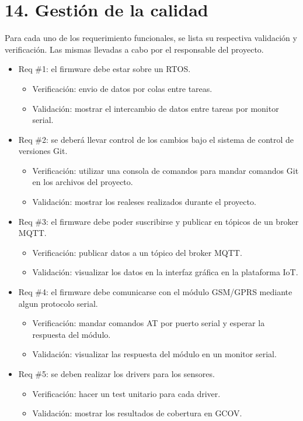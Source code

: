 \documentclass[
11pt, %
codirector, %
]{charter}
\begin{document}
\section{14. Gestión de la calidad}
\label{sec:calidad}
Para cada uno de los requerimiento funcionales, se lista su respectiva validación y verificación. Las mismas llevadas a cabo por el responsable del proyecto.

\begin{itemize} 
	\item Req \#1: el firmware debe estar sobre un RTOS.
	\begin{itemize}
		\item Verificación: envio de datos por colas entre tareas.
		\item Validación: mostrar el intercambio de datos entre tareas por monitor serial. 
	\end{itemize}

	\item Req \#2: se deberá llevar control de los cambios bajo el sistema de control de versiones Git.
	\begin{itemize}
		\item Verificación: utilizar una consola de comandos para mandar comandos Git en los archivos del proyecto.
		\item Validación: mostrar los realeses realizados durante el proyecto.  
	\end{itemize}

	\item Req \#3: el firmware debe poder suscribirse y publicar en tópicos de un broker MQTT.
	\begin{itemize}
		\item Verificación: publicar datos a un tópico del broker MQTT.
		\item Validación: visualizar los datos en la interfaz gráfica en la plataforma IoT. 
	\end{itemize}

	\item Req \#4: el firmware debe comunicarse con el módulo GSM/GPRS mediante algun protocolo serial.
	\begin{itemize}
		\item Verificación: mandar comandos AT por puerto serial y esperar la respuesta del módulo.
		\item Validación: visualizar las respuesta del módulo en un monitor serial.  
	\end{itemize}

	\item Req \#5: se deben realizar los drivers para los sensores.
	\begin{itemize}
		\item Verificación: hacer un test unitario para cada driver.
		\item Validación: mostrar los resultados de cobertura en GCOV. 
	\end{itemize}


\end{itemize}
\end{document}

